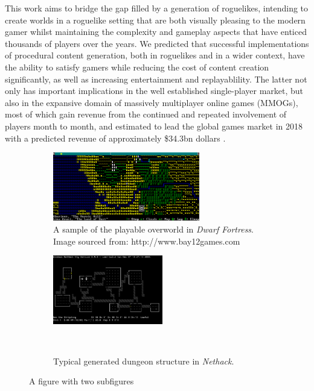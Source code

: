 \documentclass[12pt,a4paper]{article}
\begin{document}
This work aims to bridge the gap filled by a generation of roguelikes, intending to create worlds in a roguelike setting that are both visually pleasing to the modern gamer whilst maintaining the complexity and gameplay aspects that have enticed thousands of players over the years. We predicted that successful implementations of procedural content generation, both in roguelikes and in a wider context, have the ability to satisfy gamers while reducing the cost of content creation significantly, as well as increasing entertainment and replayablility. The latter not only has important implications in the well established single-player market, but also in the expansive domain of massively multiplayer online games (MMOGs), most of which gain revenue from the continued and repeated involvement of players month to month, and estimated to lead the global games market in 2018 with a predicted revenue of approximately \$34.3bn dollars \cite{newzoo}. 

\begin{figure}
\centering
\begin{subfigure}{.5\textwidth}
  \centering
  \includegraphics[width=.6\linewidth, height=3cm]{images/dwarffortress.png}
  \caption{A sample of the playable overworld in \emph{Dwarf Fortress}. Image sourced from: http://www.bay12games.com}
  \label{fig:sub1}
\end{subfigure}%
\begin{subfigure}{.5\textwidth}
  \centering
  \includegraphics[width=.6\linewidth, height=3cm]{images/nethack3.png}
  \caption{Typical generated dungeon structure in \emph{Nethack}.}
  \label{fig:sub2}
  \ \\
\end{subfigure}
\caption{A figure with two subfigures}
\label{fig:test}
\end{figure}


\end{document}
